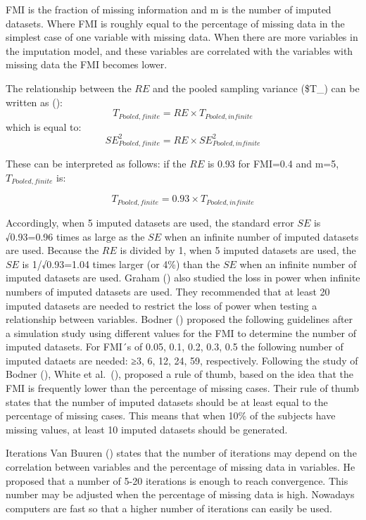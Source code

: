\documentclass[
]{book}
\begin{document}
FMI is the fraction of missing information and m is the number of imputed datasets. Where FMI is roughly equal to the percentage of missing data in the simplest case of one variable with missing data. When there are more variables in the imputation model, and these variables are correlated with the variables with missing data the FMI becomes lower.

The relationship between the \(RE\) and the pooled sampling variance (\$T\_) can be written as (\citet{VanBuuren2018}):
\[T_{Pooled,finite}=RE×T_{Pooled,infinite}\]
which is equal to:
\[SE_{Pooled,finite}^2=RE×SE_{Pooled,infinite}^2 \]

These can be interpreted as follows: if the \(RE\) is 0.93 for FMI=0.4 and m=5, \(T_{Pooled,finite}\) is:

\[T_{Pooled,finite}=0.93×T_{Pooled,infinite}\]

Accordingly, when 5 imputed datasets are used, the standard error \(SE\) is √0.93=0.96 times as large as the \(SE\) when an infinite number of imputed datasets are used. Because the \(RE\) is divided by 1, when 5 imputed datasets are used, the \(SE\) is 1/√0.93=1.04 times larger (or 4\%) than the \(SE\) when an infinite number of imputed datasets are used. Graham (\citet{Graham2007}) also studied the loss in power when infinite numbers of imputed datasets are used. They recommended that at least 20 imputed datasets are needed to restrict the loss of power when testing a relationship between variables. Bodner (\citet{Bodner2008}) proposed the following guidelines after a simulation study using different values for the FMI to determine the number of imputed datasets. For FMI´s of 0.05, 0.1, 0.2, 0.3, 0.5 the following number of imputed dataets are needed: ≥3, 6, 12, 24, 59, respectively. Following the study of Bodner (\citet{Bodner2008}), White et al.~(\citet{White2011}), proposed a rule of thumb, based on the idea that the FMI is frequently lower than the percentage of missing cases. Their rule of thumb states that the number of imputed datasets should be at least equal to the percentage of missing cases. This means that when 10\% of the subjects have missing values, at least 10 imputed datasets should be generated.

Iterations
Van Buuren (\citet{VanBuuren2018}) states that the number of iterations may depend on the correlation between variables and the percentage of missing data in variables. He proposed that a number of 5-20 iterations is enough to reach convergence. This number may be adjusted when the percentage of missing data is high. Nowadays computers are fast so that a higher number of iterations can easily be used.
\end{document}
